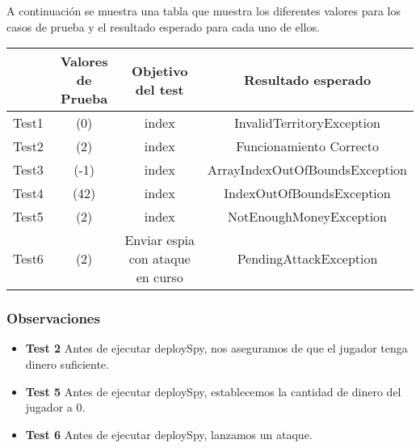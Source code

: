 A continuación se muestra una tabla que muestra los diferentes valores para los casos de prueba y el resultado esperado para cada uno de ellos.

{\footnotesize
\begin{longtable}[c]{lccc}
 & \textbf{Valores de Prueba} & \textbf{Objetivo del test} & \textbf{Resultado esperado}  \\
\hline \hline
\endhead

Test1 & (0)& index & InvalidTerritoryException \\
Test2 & (2) & index & Funcionamiento Correcto \\
Test3 & (-1)  & index & ArrayIndexOutOfBoundsException \\
Test4 & (42)  & index & IndexOutOfBoundsException\\
Test5 & (2) & index & NotEnoughMoneyException \\
Test6 & (2)  & Enviar espia con ataque en curso  & PendingAttackException\\


\hline
\end{longtable}
\subsubsection{Observaciones}
\begin{itemize}
 \item \textbf{Test 2} Antes de ejecutar deploySpy, nos aseguramos de que el jugador tenga dinero suficiente.
\item \textbf{Test 5} Antes de ejecutar deploySpy, establecemos la cantidad de dinero del jugador a 0.
\item \textbf{Test 6} Antes de ejecutar deploySpy, lanzamos un ataque.
\end{itemize}

}